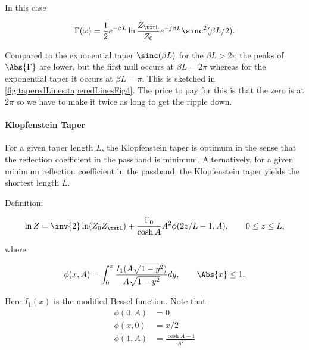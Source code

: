 In this case

\begin{dmath}\label{eqn:continuumAndOtherTransformersCore:1000}
\Gamma(\omega) = \frac{1}{2} e^{-\beta L} \ln \frac{Z_\txtL}{Z_0} e^{-j \beta L} \sinc^2( \beta L/2 ).
\end{dmath}

Compared to the exponential taper \( \sinc( \beta L ) \) for the \( \beta L > 2 \pi \) the peaks of \( \Abs{\Gamma} \) are lower, but the first null occurs at \( \beta L = 2 \pi \) whereas for the exponential taper it occurs at \( \beta L = \pi \).  This is sketched in \cref{fig:taperedLines:taperedLinesFig4}.  The price to pay for this is that the zero is at \( 2 \pi \) so we have to make it twice as long to get the ripple down.


\paragraph{Klopfenstein Taper}

For a given taper length \( L \), the Klopfenstein taper is optimum in the sense that the reflection coefficient in the passband is minimum.  Alternatively, for a given minimum reflection coefficient in the passband, the Klopfenstein taper yields the shortest length \( L \).

Definition:

\begin{equation}\label{eqn:continuumAndOtherTransformersCore:1020}
\ln Z = \inv{2} \ln (Z_0 Z_\txtL) + \frac{\Gamma_0}{\cosh A} A^2 \phi(2 z/L -1, A), \qquad 0 \le z \le L,
\end{equation}

where

\begin{equation}\label{eqn:continuumAndOtherTransformersCore:1040}
\phi(x, A) = \int_0^x \frac{I_1(A\sqrt{1 - y^2})}{A \sqrt{1 - y^2}} dy, \qquad \Abs{x} \le 1.
\end{equation}

Here \( I_1(x) \) is the modified Bessel function.  Note that 
\begin{equation}\label{eqn:continuumAndOtherTransformersCore:1060}
\begin{aligned}
\phi(0, A) &= 0 \\
\phi(x, 0) &= x/2 \\
\phi(1, A) &= \frac{\cosh A - 1}{A^2}
\end{aligned}
\end{equation}

